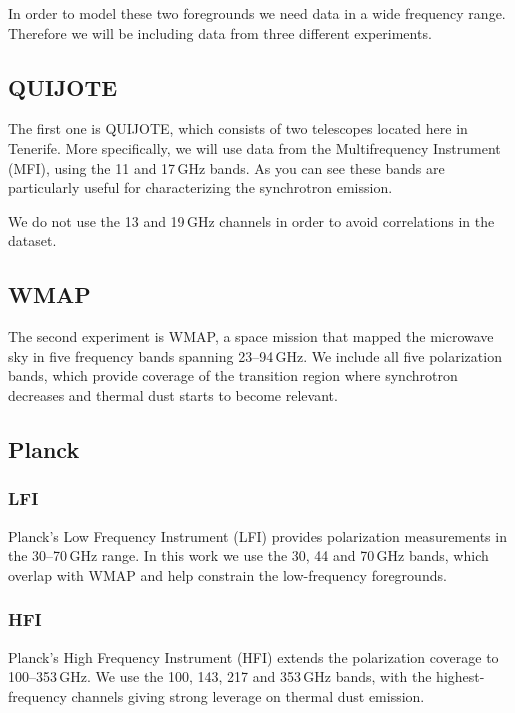 \documentclass[12pt,a4paper]{article}
\begin{document}
In order to model these two foregrounds we need data in a wide frequency range. Therefore we will be including data from three different experiments.

\subsection{QUIJOTE}

The first one is QUIJOTE, which consists of two telescopes located here in Tenerife. More specifically, we will use data from the Multifrequency Instrument (MFI), using the 11 and 17\,GHz bands. As you can see these bands are particularly useful for characterizing the synchrotron emission.

We do not use the 13 and 19\,GHz channels in order to avoid correlations in the dataset.

\subsection{WMAP}

The second experiment is WMAP, a space mission that mapped the microwave sky in five frequency bands spanning 23--94\,GHz. We include all five polarization bands, which provide coverage of the transition region where synchrotron decreases and thermal dust starts to become relevant.


\subsection{Planck}

\subsubsection{LFI}

Planck's Low Frequency Instrument (LFI) provides polarization measurements in the 30--70\,GHz range. In this work we use the 30, 44 and 70\,GHz bands, which overlap with WMAP and help constrain the low-frequency foregrounds.

\subsubsection{HFI}

Planck's High Frequency Instrument (HFI) extends the polarization coverage to 100--353\,GHz. We use the 100, 143, 217 and 353\,GHz bands, with the highest-frequency channels giving strong leverage on thermal dust emission.
\end{document}
